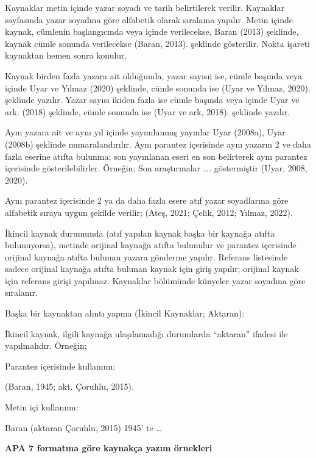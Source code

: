 Kaynaklar metin içinde yazar soyadı ve tarih belirtilerek verilir. Kaynaklar sayfasında yazar soyadına göre alfabetik olarak sıralama yapılır. Metin içinde kaynak, cümlenin başlangıcında veya içinde verilecekse, Baran (2013) şeklinde, kaynak cümle sonunda verilecekse (Baran, 2013). şeklinde gösterilir. Nokta işareti kaynaktan hemen sonra konulur.

Kaynak birden fazla yazara ait olduğunda, yazar sayısıi ise, cümle başında veya içinde Uyar ve Yılmaz (2020) şeklinde, cümle sonunda ise (Uyar ve Yılmaz, 2020). şeklinde yazılır. Yazar sayısı ikiden fazla ise cümle başında veya içinde Uyar ve ark. (2018) şeklinde, cümle sonunda ise (Uyar ve ark, 2018). şeklinde yazılır.

Aynı yazara ait ve aynı yıl içinde yayımlanmış yayınlar Uyar (2008a), Uyar (2008b) şeklinde numaralandırılır. Aynı parantez içerisinde aynı yazarın 2 ve daha fazla eserine atıfta bulunma; son yayınlanan eseri en son belirterek aynı parantez içerisinde gösterilebilirler. Örneğin; Son araştırmalar \ldots{}. göstermiştir (Uyar, 2008, 2020).

Aynı parantez içerisinde 2 ya da daha fazla esere atıf yazar soyadlarına göre alfabetik sıraya uygun şekilde verilir; (Ateş, 2021; Çelik, 2012; Yılmaz, 2022).

İkincil kaynak durumunda (atıf yapılan kaynak başka bir kaynağa atıfta bulunuyorsa), metinde orijinal kaynağa atıfta bulunulur ve parantez içerisinde orijinal kaynağa atıfta bulunan yazara gönderme yapılır. Referans listesinde sadece orijinal kaynağa atıfta bulunan kaynak için giriş yapılır; orijinal kaynak için referans girişi yapılmaz. Kaynaklar bölümünde künyeler yazar soyadına göre sıralanır.

Başka bir kaynaktan alıntı yapma (İkincil Kaynaklar; Aktaran):

İkincil kaynak, ilgili kaynağa ulaşılamadığı durumlarda “aktaran” ifadesi ile yapılmalıdır. Örneğin;

Parantez içerisinde kullanımı:

(Baran, 1945; akt. Çoruhlu, 2015).

Metin içi kullanımı:

Baran (aktaran Çoruhlu, 2015) 1945’ te \ldots{}

\textbf{APA 7  formatına göre kaynakça yazım örnekleri}

